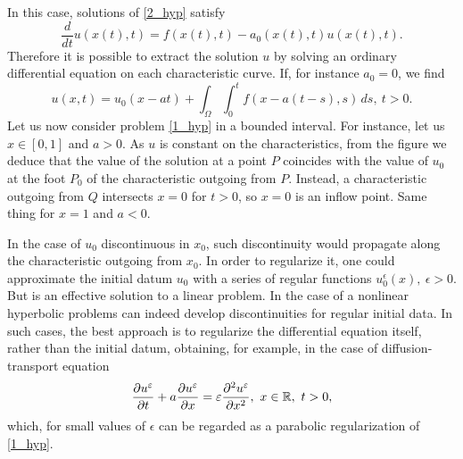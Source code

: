 In this case, solutions of \eqref{2_hyp} satisfy
\[
    \frac{d}{dt} u(x(t), t) = f(x(t), t) - a_0(x(t),t)u(x(t),t).
\]
Therefore it is possible to extract the solution \(u\) by solving an ordinary differential equation on each characteristic curve. If, for instance \(a_0 = 0\), we find 
\[
    u(x,t) = u_0(x-at) + \int_\Omega \int_0^t f(x-a(t-s),s) \, ds, \ t > 0.
\]
Let us now consider problem \eqref{1_hyp} in a bounded interval. For instance, let us \(x \in [0,1]\) and \(a > 0\). As \(u\) is constant on the characteristics, from the figure we deduce that the value of the solution at a point \(P\) coincides with the value of \(u_0\) at the foot \(P_0\) of the characteristic outgoing from \(P\). Instead, a characteristic outgoing from \(Q\) intersects \(x=0\) for \(t>0\), so \(x=0\) is an inflow point. Same thing for \(x=1\) and \(a<0\).

In the case of \(u_0\) discontinuous in \(x_0\), such discontinuity would propagate along the characteristic outgoing from \(x_0\). In order to regularize it, one could approximate the initial datum \(u_0\) with a series of regular functions \(u_0^\epsilon(x), \ \epsilon > 0\). But is an effective solution to a linear problem. In the case of a nonlinear hyperbolic problems can indeed develop discontinuities for regular initial data. In such cases, the best approach is to regularize the differential equation itself, rather than the initial datum, obtaining, for example, in the case of diffusion-transport equation 
\[
    \partialderivative{u^\epsilon}{t} + a\partialderivative{u^\epsilon}{x} = \epsilon\partialderivative{^2u^\epsilon}{x^2}, \ x\in \real, \ t > 0,
\]
which, for small values of \(\epsilon\) can be regarded as a parabolic regularization of \eqref{1_hyp}. 
